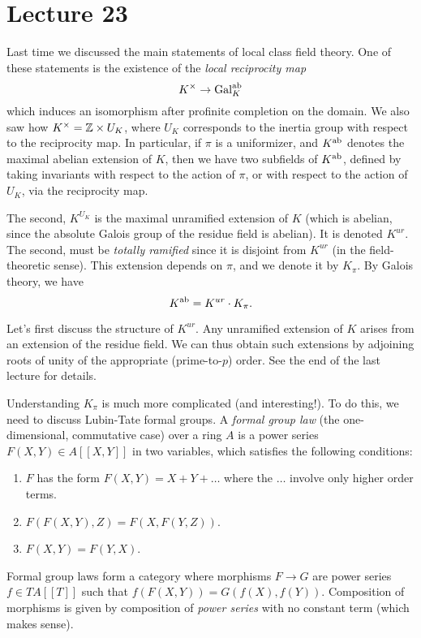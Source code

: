 \section{Lecture 23}

Last time we discussed the main statements of local class field theory.
One of these statements is the existence of the \emph{local reciprocity map}
\[ K^{\times} \to \operatorname{Gal}_{K}^{\mathrm{ab}} \]
which induces an isomorphism after profinite completion on the domain.
We also saw how $K^{\times} = \mathbb{Z} \times U_{K}$, where $U_{K}$ corresponds to the inertia group with respect to the reciprocity map.
In particular, if $\pi$ is a uniformizer, and $K^{\mathrm{ab}}$ denotes the maximal abelian extension of $K$, then we have two subfields of $K^{\mathrm{ab}}$, defined by taking invariants with respect to the action of $\pi$, or with respect to the action of $U_{K}$, via the reciprocity map.

The second, $K^{U_{K}}$ is the maximal unramified extension of $K$ (which is abelian, since the absolute Galois group of the residue field is abelian).
It is denoted $K^{ur}$.
The second, must be \emph{totally ramified} since it is disjoint from $K^{ur}$ (in the field-theoretic sense).
This extension depends on $\pi$, and we denote it by $K_{\pi}$.
By Galois theory, we have
\[ K^{\mathrm{ab}} = K^{ur} \cdot K_{\pi}. \]

Let's first discuss the structure of $K^{ur}$.
Any unramified extension of $K$ arises from an extension of the residue field.
We can thus obtain such extensions by adjoining roots of unity of the appropriate (prime-to-$p$) order.
See the end of the last lecture for details.

Understanding $K_{\pi}$ is much more complicated (and interesting!).
To do this, we need to discuss Lubin-Tate formal groups.
A \emph{formal group law} (the one-dimensional, commutative case) over a ring $A$ is a power series $F(X,Y) \in A[[X,Y]]$ in two variables, which satisfies the following conditions:
\begin{enumerate}
  \item $F$ has the form $F(X,Y) = X + Y + \ldots$ where the $\ldots$ involve only higher order terms.
  \item $F(F(X,Y),Z) = F(X,F(Y,Z))$.
  \item $F(X,Y) = F(Y,X)$.
\end{enumerate}
Formal group laws form a category where morphisms $F \to G$ are power series $f \in TA[[T]]$ such that $f(F(X,Y)) = G(f(X),f(Y))$.
Composition of morphisms is given by composition of \emph{power series} with no constant term (which makes sense).

